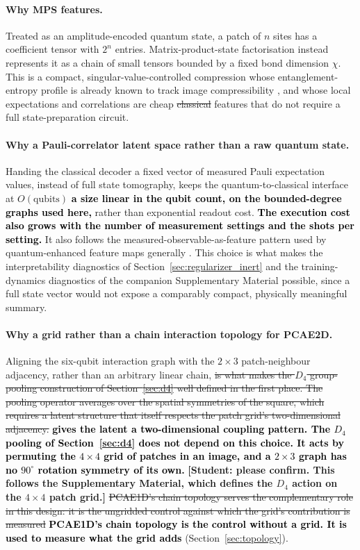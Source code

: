 \documentclass[pdflatex,sn-basic]{sn-jnl}
\newcommand{\del}[1]{\sout{#1}}
\newcommand{\add}[1]{\textbf{\textcolor{black}{#1}}}
\begin{document}
\paragraph{Why MPS features.}
Treated as an amplitude-encoded quantum state, a patch of $n$ sites has a
coefficient tensor with $2^{n}$ entries. Matrix-product-state factorisation
instead represents it as a chain of small tensors bounded by a fixed bond
dimension $\chi$. This is a compact, singular-value-controlled compression whose
entanglement-entropy profile is already known to track image compressibility
\citep{Latorre2005, Stoudenmire2016}, and whose local expectations and
correlations are cheap \del{classical} features that do not require a full
state-preparation circuit.


\paragraph{Why a Pauli-correlator latent space rather than a raw quantum state.}
Handing the classical decoder a fixed vector of measured Pauli expectation
values, instead of full state tomography, keeps the quantum-to-classical
interface at \del{$O(\text{qubits})$} \add{a size linear in the qubit count, on
the bounded-degree graphs used here,} rather than exponential readout cost.
\add{The execution cost also grows with the number of measurement settings and
the shots per setting.} It also
follows the measured-observable-as-feature pattern used by quantum-enhanced
feature maps generally \citep{Havlicek2019}. This choice is what makes the
interpretability diagnostics of Section~\ref{sec:regularizer_inert} and the
training-dynamics diagnostics of the companion Supplementary Material possible,
since a full state vector would not expose a comparably compact, physically
meaningful summary.



\paragraph{Why a grid rather than a chain interaction topology for PCAE2D.}
Aligning the six-qubit interaction graph with the $2\times3$ patch-neighbour
adjacency, rather than an arbitrary linear chain, \del{is what makes the $D_4$
group-pooling construction of Section~\ref{sec:d4} well defined in the first
place. The pooling operator averages over the spatial symmetries of the square,
which requires a latent structure that itself respects the patch grid's
two-dimensional adjacency.} \add{gives the latent a two-dimensional coupling
pattern. The $D_4$ pooling of Section~\ref{sec:d4} does not depend on this
choice. It acts by permuting the $4\times4$ grid of patches in an image, and a
$2\times3$ graph has no $90^\circ$ rotation symmetry of its own.}
{\color{red}\textbf{[Student: please confirm. This follows the Supplementary
Material, which defines the $D_4$ action on the $4\times4$ patch grid.]}}
\del{PCAE1D's chain topology serves the complementary role
in this design: it is the ungridded control against which the grid's
contribution is measured} \add{PCAE1D's chain topology is the control without
a grid. It is used to measure what the grid adds} (Section~\ref{sec:topology}).
\end{document}
